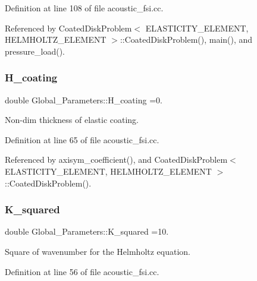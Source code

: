 Definition at line 108 of file acoustic\+\_\+fsi.\+cc.



Referenced by Coated\+Disk\+Problem$<$ E\+L\+A\+S\+T\+I\+C\+I\+T\+Y\+\_\+\+E\+L\+E\+M\+E\+N\+T, H\+E\+L\+M\+H\+O\+L\+T\+Z\+\_\+\+E\+L\+E\+M\+E\+N\+T $>$\+::\+Coated\+Disk\+Problem(), main(), and pressure\+\_\+load().

\mbox{\label{namespaceGlobal__Parameters_ae3cf8878ede839bffda01f79bbe3e819}} 
\subsubsection{\texorpdfstring{H\+\_\+coating}{H\_coating}}
{\footnotesize\ttfamily double Global\+\_\+\+Parameters\+::\+H\+\_\+coating =0.}



Non-\/dim thickness of elastic coating. 



Definition at line 65 of file acoustic\+\_\+fsi.\+cc.



Referenced by axisym\+\_\+coefficient(), and Coated\+Disk\+Problem$<$ E\+L\+A\+S\+T\+I\+C\+I\+T\+Y\+\_\+\+E\+L\+E\+M\+E\+N\+T, H\+E\+L\+M\+H\+O\+L\+T\+Z\+\_\+\+E\+L\+E\+M\+E\+N\+T $>$\+::\+Coated\+Disk\+Problem().

\mbox{\label{namespaceGlobal__Parameters_a91a3fa265abaf9e724c668ee800ffb29}} 
\subsubsection{\texorpdfstring{K\+\_\+squared}{K\_squared}}
{\footnotesize\ttfamily double Global\+\_\+\+Parameters\+::\+K\+\_\+squared =10.}



Square of wavenumber for the Helmholtz equation. 



Definition at line 56 of file acoustic\+\_\+fsi.\+cc.



